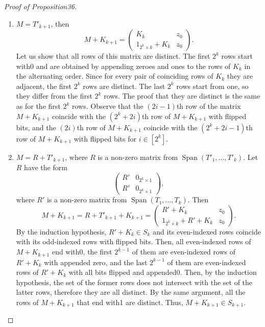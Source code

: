 \begin{proof}[Proof of Proposition36]
\begin{enumerate}
\[
M+K_{k+1}=\begin{pmatrix}M'+K_k&0_{2^k\times1}\\M'+K_k&1_{2^k\times1}\end{pmatrix};
\]
it follows from the induction hypothesis that all rows of this matrix are distinct, i.e. $M+K_{k+1}\in S_{k+1}$. In order to verify that the set of even-indexed rows of this matrix coincide with the set of odd-indexed rows with all bits flipped, observe that by induction hypothesis the first $2^{k-1}$ even-indexed rows of $M+K_{k+1}$ coincide with the last $2^{k-1}$ odd-indexed rows of $M+K_{k+1}$ with all bits flipped, and the first $2^{k-1}$ odd-indexed rows of $M+K_{k+1}$ coincide with the last $2^{k-1}$ even-indexed rows of $M+K_{k+1}$ with flipped bits.
\item $M=T'_{k+1}$, then
\[
M+K_{k+1}=\begin{pmatrix}K_k&z_0\\1_{2^k\times k}+K_k&z_0\end{pmatrix}.
\]
Let us show that all rows of this matrix are distinct. The first $2^k$ rows start with0 and are obtained by appending zeroes and ones to the rows of $K_k$ in the alternating order. Since for every pair of coinciding rows of $K_k$ they are adjacent, the first $2^k$ rows are distinct. The last $2^k$ rows start from one, so they differ from the first $2^k$ rows. The proof that they are distinct is the same as for the first $2^k$ rows. Observe that the $(2i-1)$th row of the matrix $M+K_{k+1}$ coincide with the $(2^k+2i)$th row of $M+K_{k+1}$ with flipped bits, and the $(2i)$th row of $M+K_{k+1}$ coincide with the $(2^k+2i-1)$th row of $M+K_{k+1}$ with flipped bits for $i\in[2^k]$.
\item $M=R+T'_{k+1}$, where $R$ is a non-zero matrix from $\operatorname{Span}(T'_1,\ldots,T'_k)$. Let $R$ have the form
\[
\begin{pmatrix}R'&0_{2^k\times1}\\R'&0_{2^k\times1}\end{pmatrix},
\]
where $R'$ is a non-zero matrix from $\operatorname{Span}(T_1,\ldots,T_k)$. Then
\[
M+K_{k+1}=R+T'_{k+1}+K_{k+1}
=\begin{pmatrix}R'+K_k&z_0\\1_{2^k\times k}+R'+K_k&z_0\end{pmatrix}.
\]
By the induction hypothesis, $R'+K_k\in S_k$ and its even-indexed rows coincide with its odd-indexed rows with flipped bits. Then, all even-indexed rows of $M+K_{k+1}$ end with0, the first $2^{k-1}$ of them are even-indexed rows of $R'+K_k$ with appended zero, and the last $2^{k-1}$ of them are even-indexed rows of $R'+K_k$ with all bits flipped and appended0. Then, by the induction hypothesis, the set of the former rows does not intersect with the set of the latter rows, therefore they are all distinct. By the same argument, all the rows of $M+K_{k+1}$ that end with1 are distinct. Thus, $M+K_{k+1}\in S_{k+1}$.

\end{enumerate}
\end{proof}
